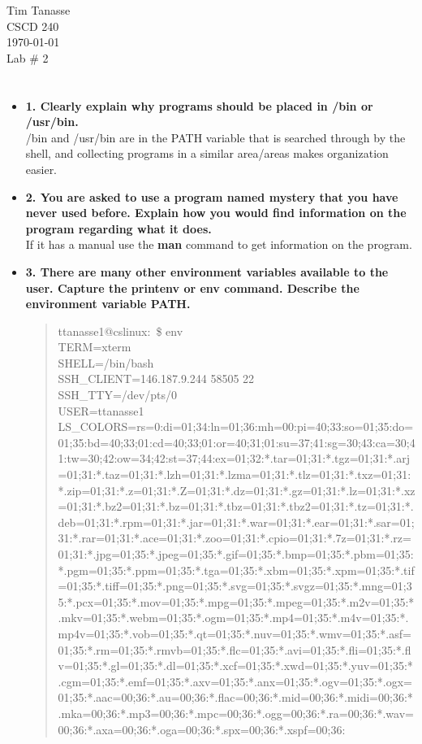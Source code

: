 \documentclass{article}
\begin{document}
\begin{flushright}
  Tim Tanasse\\
  CSCD 240\\
  \today \\
  Lab \# 2 \\
\end{flushright}
\section*{}
\begin{itemize}
  \item \textbf{1. Clearly explain why programs should be placed in /bin or /usr/bin.}\\
  /bin and /usr/bin are in the PATH variable that is searched through by the shell, and collecting programs in a similar area/areas makes organization easier.
  \item \textbf{2. You are asked to use a program named mystery that you have never used before. Explain how you would find information on the program regarding what it does. }\\
  If it has a manual use the \textbf{man} command to get information on the program.
  \item \textbf{3. There are many other environment variables available to the user.  Capture the printenv or env command.  Describe the environment variable PATH.}
  \begin{quote}
    ttanasse1@cslinux:~\$ env\\
TERM=xterm\\
SHELL=/bin/bash\\
SSH\_CLIENT=146.187.9.244 58505 22\\
SSH\_TTY=/dev/pts/0\\
USER=ttanasse1\\
LS\_COLORS=rs=0:di=01;34:ln=01;36:mh=00:pi=40;33:so=01;35:do=01;35:bd=40;33;01:cd=40;33;01:or=40;31;01:su=37;41:sg=30;43:ca=30;41:tw=30;42:ow=34;42:st=37;44:ex=01;32:*.tar=01;31:*.tgz=01;31:*.arj=01;31:*.taz=01;31:*.lzh=01;31:*.lzma=01;31:*.tlz=01;31:*.txz=01;31:*.zip=01;31:*.z=01;31:*.Z=01;31:*.dz=01;31:*.gz=01;31:*.lz=01;31:*.xz=01;31:*.bz2=01;31:*.bz=01;31:*.tbz=01;31:*.tbz2=01;31:*.tz=01;31:*.deb=01;31:*.rpm=01;31:*.jar=01;31:*.war=01;31:*.ear=01;31:*.sar=01;31:*.rar=01;31:*.ace=01;31:*.zoo=01;31:*.cpio=01;31:*.7z=01;31:*.rz=01;31:*.jpg=01;35:*.jpeg=01;35:*.gif=01;35:*.bmp=01;35:*.pbm=01;35:*.pgm=01;35:*.ppm=01;35:*.tga=01;35:*.xbm=01;35:*.xpm=01;35:*.tif=01;35:*.tiff=01;35:*.png=01;35:*.svg=01;35:*.svgz=01;35:*.mng=01;35:*.pcx=01;35:*.mov=01;35:*.mpg=01;35:*.mpeg=01;35:*.m2v=01;35:*.mkv=01;35:*.webm=01;35:*.ogm=01;35:*.mp4=01;35:*.m4v=01;35:*.mp4v=01;35:*.vob=01;35:*.qt=01;35:*.nuv=01;35:*.wmv=01;35:*.asf=01;35:*.rm=01;35:*.rmvb=01;35:*.flc=01;35:*.avi=01;35:*.fli=01;35:*.flv=01;35:*.gl=01;35:*.dl=01;35:*.xcf=01;35:*.xwd=01;35:*.yuv=01;35:*.cgm=01;35:*.emf=01;35:*.axv=01;35:*.anx=01;35:*.ogv=01;35:*.ogx=01;35:*.aac=00;36:*.au=00;36:*.flac=00;36:*.mid=00;36:*.midi=00;36:*.mka=00;36:*.mp3=00;36:*.mpc=00;36:*.ogg=00;36:*.ra=00;36:*.wav=00;36:*.axa=00;36:*.oga=00;36:*.spx=00;36:*.xspf=00;36:\\

\end{quote}
\end{itemize}
\end{document}

